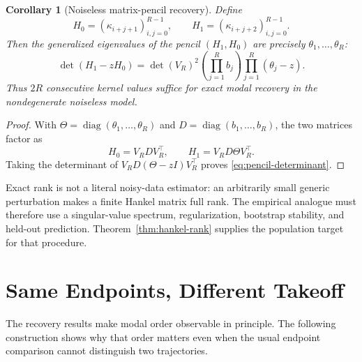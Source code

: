 \documentclass[10pt,twocolumn]{article}
\newtheorem{corollary}{Corollary}
\begin{document}
\begin{corollary}[Noiseless matrix-pencil recovery]\label{cor:matrix-pencil}
Define
\begin{equation}\label{eq:hankel-pencil}
 H_0=(\kappa_{i+j+1})_{i,j=0}^{R-1},
 \qquad
 H_1=(\kappa_{i+j+2})_{i,j=0}^{R-1}.
\end{equation}
Then the generalized eigenvalues of the pencil $(H_1,H_0)$ are precisely
$\theta_1,\ldots,\theta_R$:
\begin{equation}\label{eq:pencil-determinant}
 \det(H_1-zH_0)
 =
 \det(V_R)^2
 \left(\prod_{j=1}^{R}b_j\right)
 \prod_{j=1}^{R}(\theta_j-z).
\end{equation}
Thus $2R$ consecutive kernel values suffice for exact modal recovery in the
nondegenerate noiseless model.
\end{corollary}

\begin{proof}
With $\Theta=\operatorname{diag}(\theta_1,\ldots,\theta_R)$ and
$D=\operatorname{diag}(b_1,\ldots,b_R)$, the two matrices factor as
\[
 H_0=V_RDV_R^\top,
 \qquad
 H_1=V_RD\Theta V_R^\top.
\]
Taking the determinant of
$V_RD(\Theta-zI)V_R^\top$ proves \eqref{eq:pencil-determinant}.
\end{proof}

Exact rank is not a literal noisy-data estimator: an arbitrarily small generic
perturbation makes a finite Hankel matrix full rank.  The empirical analogue
must therefore use a singular-value spectrum, regularization, bootstrap
stability, and held-out prediction.  Theorem~\ref{thm:hankel-rank} supplies the
population target for that procedure.

\section{Same Endpoints, Different Takeoff}

The recovery results make modal order observable in principle.  The following
construction shows why that order matters even when the usual endpoint
comparison cannot distinguish two trajectories.
\end{document}
